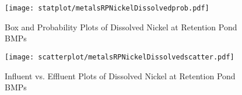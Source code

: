         \begin{figure}[hb]   %
            \centering
            \texttt{[image: statplot/metalsRPNickelDissolvedprob.pdf]}
            \caption{Box and Probability Plots of Dissolved Nickel at Retention Pond BMPs}
        \end{figure}         %
        
        
        \begin{figure}[hb]   %
            \centering
            \texttt{[image: scatterplot/metalsRPNickelDissolvedscatter.pdf]}
            \caption{Influent vs. Effluent Plots of Dissolved Nickel at Retention Pond BMPs}
        \end{figure}         %
        \clearpage
        